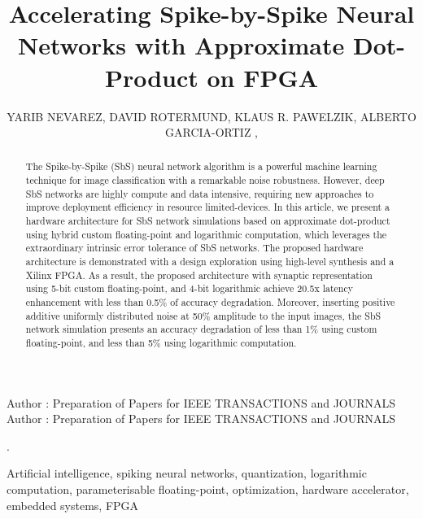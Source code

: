 \title {Accelerating Spike-by-Spike Neural Networks with Approximate Dot-Product on FPGA}

\author{
	\uppercase{Yarib Nevarez},	
	\uppercase{David Rotermund},
	\uppercase{Klaus R. Pawelzik},
	\uppercase{Alberto Garcia-Ortiz} ,
}

\address[1]{Institute of Electrodynamics and Microelectronics, University of Bremen, Bremen 28359, Germany (e-mail: nevarez@item.uni-bremen.de)}

\address[2]{Institute for Theoretical Physics, University of Bremen, Bremen 28359, Germany (e-mail: davrot@@neuro.uni-bremen.de)}

\address[3]{Institute for Theoretical Physics, University of Bremen, Bremen 28359, Germany (e-mail: pawelzik@@neuro.uni-bremen.de)}

\address[4]{Institute of Electrodynamics and Microelectronics, University of Bremen, Bremen 28359, Germany (e-mail: agaracia@item.uni-bremen.de)}


\markboth
{Author \headeretal: Preparation of Papers for IEEE TRANSACTIONS and JOURNALS}
{Author \headeretal: Preparation of Papers for IEEE TRANSACTIONS and JOURNALS}

.

\begin{abstract}
The Spike-by-Spike (SbS) neural network algorithm is a powerful machine learning technique for image classification with a remarkable noise robustness. However, deep SbS networks are highly compute and data intensive, requiring new approaches to improve deployment efficiency in resource limited-devices. In this article, we present a hardware architecture for SbS network simulations based on approximate dot-product using hybrid custom floating-point and logarithmic computation, which leverages the extraordinary intrinsic error tolerance of SbS networks. The proposed hardware architecture is demonstrated with a design exploration using high-level synthesis and a Xilinx FPGA. As a result, the proposed architecture with synaptic representation using 5-bit custom floating-point, and 4-bit logarithmic achieve 20.5x latency enhancement with less than 0.5\% of accuracy degradation. Moreover, inserting positive additive uniformly distributed noise at 50\% amplitude to the input images, the SbS network simulation presents an accuracy degradation of less than 1\% using custom floating-point, and less than 5\% using logarithmic computation.
	
\end{abstract}

\begin{keywords}
Artificial intelligence, spiking neural networks, quantization, logarithmic computation, parameterisable floating-point, optimization, hardware accelerator, embedded systems, FPGA
\end{keywords}

\titlepgskip=-15pt

\maketitle
